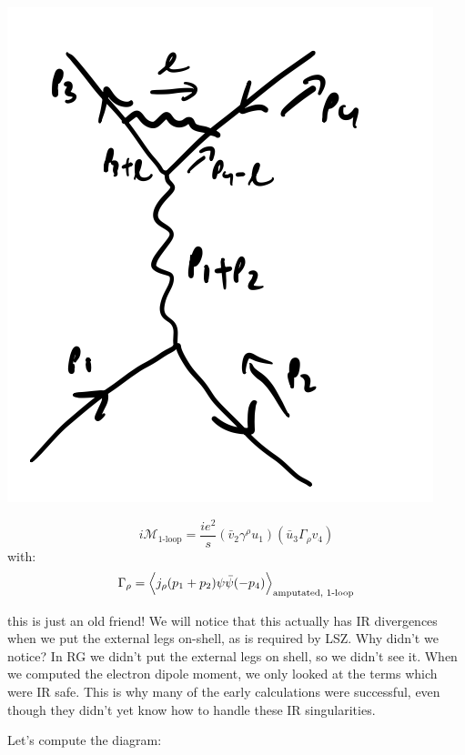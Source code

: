 \begin{center}
    \includegraphics[scale=0.35]{Lectures/Images/lec14-oneloopmomenta.png}
\end{center}

\begin{equation}
    i\mathcal{M}_{\text{1-loop}} =  \frac{ie^2}{s}(\bar{v}_2\gamma^\rho u_1)(\bar{u}_3\Gamma_\rho v_4)
\end{equation}
with:
\begin{equation}
    \Gamma_\rho = \left< j_\rho(p_1 + p_2)\psi\bar{\psi}(-p_4) \right>_{\text{amputated, 1-loop}}
\end{equation}

this is just an old friend! We will notice that this actually has IR divergences when we put the external legs on-shell, as is required by LSZ. Why didn't we notice? In RG we didn't put the external legs on shell, so we didn't see it. When we computed the electron dipole moment, we only looked at the terms which were IR safe. This is why many of the early calculations were successful, even though they didn't yet know how to handle these IR singularities.

Let's compute the diagram:

